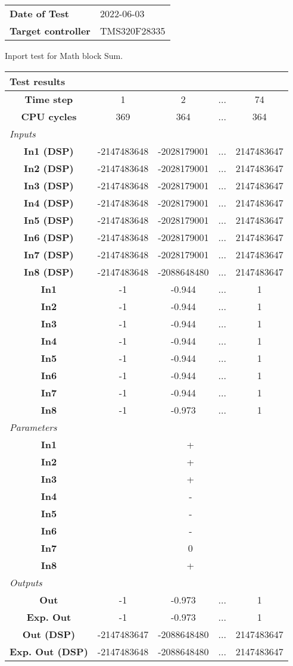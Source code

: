 \begin{tabular}{l l}
\textbf{Date of Test} & 2022-06-03 \tabularnewline
\textbf{Target controller} & TMS320F28335 \tabularnewline
\end{tabular}
\vspace{1ex}
Inport test for Math block Sum.

\vspace{1em}
\begin{tabularx}{\textwidth}{|c|c|c|>{\centering\arraybackslash}X|c|}
\hline
\multicolumn{5}{|l|}{\cellcolor[gray]{0.8}\textbf{Test results}} \tabularnewline \hline
\textbf{Time step} & 1 & 2 & ... & 74 \tabularnewline \hline
\textbf{CPU cycles} & 369 & 364 & ... & 364 \tabularnewline \hline
\multicolumn{5}{|l|}{\cellcolor[gray]{0.9}\textit{Inputs}} \tabularnewline \hline
\textbf{In1 (DSP)} & -2147483648 & -2028179001 & ... & 2147483647 \tabularnewline \hline
\textbf{In2 (DSP)} & -2147483648 & -2028179001 & ... & 2147483647 \tabularnewline \hline
\textbf{In3 (DSP)} & -2147483648 & -2028179001 & ... & 2147483647 \tabularnewline \hline
\textbf{In4 (DSP)} & -2147483648 & -2028179001 & ... & 2147483647 \tabularnewline \hline
\textbf{In5 (DSP)} & -2147483648 & -2028179001 & ... & 2147483647 \tabularnewline \hline
\textbf{In6 (DSP)} & -2147483648 & -2028179001 & ... & 2147483647 \tabularnewline \hline
\textbf{In7 (DSP)} & -2147483648 & -2028179001 & ... & 2147483647 \tabularnewline \hline
\textbf{In8 (DSP)} & -2147483648 & -2088648480 & ... & 2147483647 \tabularnewline \hline
\textbf{In1} & -1 & -0.944 & ... & 1 \tabularnewline \hline
\textbf{In2} & -1 & -0.944 & ... & 1 \tabularnewline \hline
\textbf{In3} & -1 & -0.944 & ... & 1 \tabularnewline \hline
\textbf{In4} & -1 & -0.944 & ... & 1 \tabularnewline \hline
\textbf{In5} & -1 & -0.944 & ... & 1 \tabularnewline \hline
\textbf{In6} & -1 & -0.944 & ... & 1 \tabularnewline \hline
\textbf{In7} & -1 & -0.944 & ... & 1 \tabularnewline \hline
\textbf{In8} & -1 & -0.973 & ... & 1 \tabularnewline \hline
\multicolumn{5}{|l|}{\cellcolor[gray]{0.9}\textit{Parameters}} \tabularnewline \hline
\textbf{In1} & \multicolumn{4}{c|}{+} \tabularnewline \hline
\textbf{In2} & \multicolumn{4}{c|}{+} \tabularnewline \hline
\textbf{In3} & \multicolumn{4}{c|}{+} \tabularnewline \hline
\textbf{In4} & \multicolumn{4}{c|}{-} \tabularnewline \hline
\textbf{In5} & \multicolumn{4}{c|}{-} \tabularnewline \hline
\textbf{In6} & \multicolumn{4}{c|}{-} \tabularnewline \hline
\textbf{In7} & \multicolumn{4}{c|}{0} \tabularnewline \hline
\textbf{In8} & \multicolumn{4}{c|}{+} \tabularnewline \hline
\multicolumn{5}{|l|}{\cellcolor[gray]{0.9}\textit{Outputs}} \tabularnewline \hline
\textbf{Out} & -1 & -0.973 & ... & 1 \tabularnewline \hline
\textbf{Exp. Out} & -1 & -0.973 & ... & 1 \tabularnewline \hline
\textbf{Out (DSP)} & -2147483647 & -2088648480 & ... & 2147483647 \tabularnewline \hline
\textbf{Exp. Out (DSP)} & -2147483648 & -2088648480 & ... & 2147483647 \tabularnewline \hline
\end{tabularx}
\vspace{1ex}

